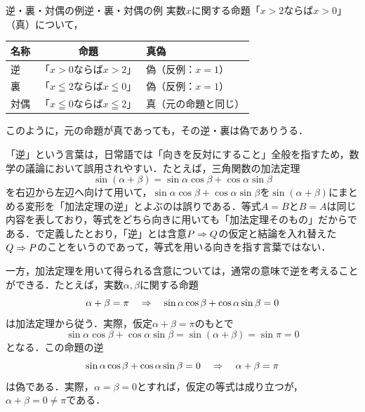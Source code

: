 \begin{example}{逆・裏・対偶の例}{逆・裏・対偶の例}
  実数$x$に関する命題「$x > 2$ならば$x > 0$」（真）について，
  \begin{center}
    \begin{tabular}{|l|c|l|} \hline
      名称 & 命題                                  & 真偽                 \\ \hline
      逆   & 「$x > 0$ならば$x > 2$」              & 偽（反例：$x = 1$）  \\ \hline
      裏   & 「$x \leqq 2$ならば$x \leqq 0$」      & 偽（反例：$x = 1$）  \\ \hline
      対偶 & 「$x \leqq 0$ならば$x \leqq 2$」      & 真（元の命題と同じ） \\ \hline
    \end{tabular}
  \end{center}
  このように，元の命題が真であっても，その逆・裏は偽でありうる．
\end{example}

\begin{remark}[「逆」の誤用に注意]
  「逆」という言葉は，日常語では「向きを反対にすること」全般を指すため，数学の議論において誤用されやすい．たとえば，三角関数の加法定理
  \[
    \sin (\alpha + \beta) = \sin \alpha \cos \beta + \cos \alpha \sin \beta
  \]
  を右辺から左辺へ向けて用いて，$\sin \alpha \cos \beta + \cos \alpha \sin \beta$を$\sin (\alpha + \beta)$にまとめる変形を「加法定理の逆」とよぶのは誤りである．等式$A = B$と$B = A$は同じ内容を表しており，等式をどちら向きに用いても「加法定理そのもの」だからである．で定義したとおり，「逆」とは含意$P \mathrel{\Rightarrow} Q$の仮定と結論を入れ替えた$Q \mathrel{\Rightarrow} P$のことをいうのであって，等式を用いる向きを指す言葉ではない．

  一方，加法定理を用いて得られる含意については，通常の意味で逆を考えることができる．たとえば，実数$\alpha,\beta$に関する命題
  \[
    \alpha + \beta = \pi
    \quad \mathrel{\Rightarrow} \quad
    \sin \alpha \cos \beta + \cos \alpha \sin \beta = 0
  \]
  は加法定理から従う．実際，仮定$\alpha + \beta = \pi$のもとで
  \[
    \sin \alpha \cos \beta + \cos \alpha \sin \beta
    = \sin (\alpha + \beta)
    = \sin \pi
    = 0
  \]
  となる．この命題の逆
  \[
    \sin \alpha \cos \beta + \cos \alpha \sin \beta = 0
    \quad \mathrel{\Rightarrow} \quad
    \alpha + \beta = \pi
  \]
  は偽である．実際，$\alpha = \beta = 0$とすれば，仮定の等式は成り立つが，$\alpha + \beta = 0 \ne \pi$である．
\end{remark}

